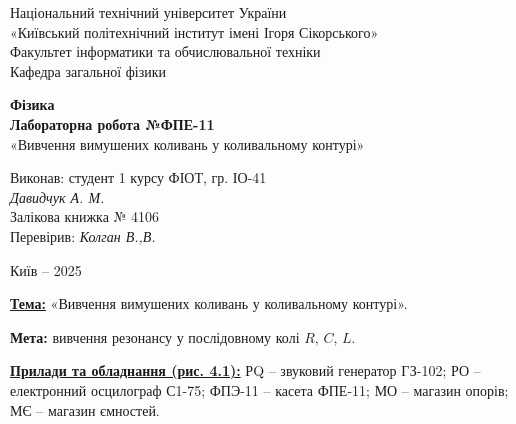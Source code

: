 \documentclass[12pt, a4paper]{article}
\begin{document}
    \begin{titlepage}

        \thispagestyle{empty}
        \begin{center}
        \large
            Національний технічний університет України\\
            «Київський політехнічний інститут імені Ігоря Сікорського»\\[1em]
            Факультет інформатики та обчислювальної техніки\\
            Кафедра загальної фізики
        \end{center}

        \vfill

        \begin{center}
        \textbf{\LARGE Фізика}\\[2em]
        \textbf{\Large Лабораторна робота №ФПЕ-11}\\
        «Вивчення вимушених коливань у коливальному контурі» 
        \end{center}

        \vfill

        \begin{flushright}
        Виконав: студент 1 курсу ФІОТ, гр. ІО-41\\
        \textit{Давидчук А. М.}\\
        Залікова книжка № 4106\\[1em]
        Перевірив: \textit{Колган В.,В.}
        \end{flushright}

        \vfill

        \begin{center}
        Київ -- 2025
        \end{center}

    \end{titlepage}

    \setlength{\parindent}{0pt}

    \textbf{\underline{Тема:}} «Вивчення вимушених коливань у коливальному контурі».

    \vspace{1em}

    \textbf{Мета:} вивчення резонансу у послідовному колі $R$, $C$, $L$.

    \vspace{1em}

    \textbf{\underline{Прилади та обладнання (рис. 4.1):}}
    РQ – звуковий генератор ГЗ-102; РО – електронний осцилограф С1-75;
    ФПЭ-11 – касета ФПЕ-11; МО – магазин опорів; МЄ – магазин ємностей.
\end{document}
